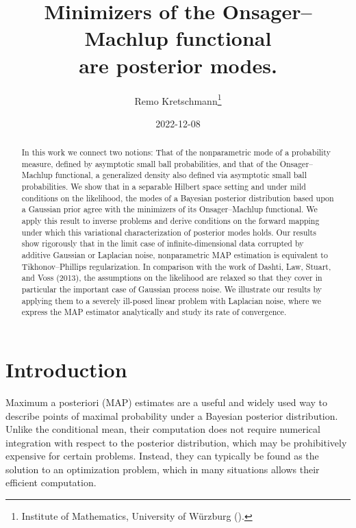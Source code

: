 \documentclass[english]{jnsao}
\title{Minimizers of the Onsager--Machlup functional\\are posterior modes.}
\author{Remo Kretschmann\thanks{Institute of Mathematics, University of Würzburg (\email{remo.kretschmann@mathematik.uni-wuerzburg.de}).}}
\date{2022-12-08}
\theoremstyle{definition}
\begin{document}
\maketitle

\begin{abstract}
In this work we connect two notions: That of the nonparametric mode of a probability measure, defined by asymptotic small ball probabilities, and that of the Onsager--Machlup functional, a generalized density also defined via asymptotic small ball probabilities. We show that in a separable Hilbert space setting and under mild conditions on the likelihood, the modes of a Bayesian posterior distribution based upon a Gaussian prior agree with the minimizers of its Onsager--Machlup functional.
We apply this result to inverse problems and derive conditions on the forward mapping under which this variational characterization of posterior modes holds. Our results show rigorously that in the limit case of infinite-dimensional data corrupted by additive Gaussian or Laplacian noise, nonparametric MAP estimation is equivalent to Tikhonov--Phillips regularization. In comparison with the work of Dashti, Law, Stuart, and Voss (2013), the assumptions on the likelihood are relaxed so that they cover in particular the important case of Gaussian process noise.
We illustrate our results by applying them to a severely ill-posed linear problem with Laplacian noise, where we express the MAP estimator analytically and study its rate of convergence.
\end{abstract}

\section{Introduction}

Maximum a posteriori (MAP) estimates are a useful and widely used way to describe points of maximal probability under a Bayesian posterior distribution. Unlike the conditional mean, their computation does not require numerical integration with respect to the posterior distribution, which may be prohibitively expensive for certain problems. Instead, they can typically be found as the solution to an optimization problem, which in many situations allows their efficient computation.
\end{document}
